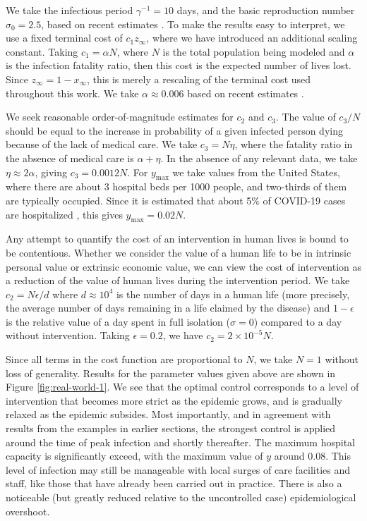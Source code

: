 \documentclass[english,12pt,letter]{article}
\newcommand{\Rnot}{\sigma_0}
\newcommand{\Sinf}{x_\infty}
\newcommand{\ymax}{y_\text{max}}
\begin{document}
We take the infectious period $\gamma^{-1}=10$ days, and the basic reproduction
number $\Rnot=2.5$, based on recent estimates \cite{verity2020estimates,liu2020reproductive}.
To make the results easy to interpret, we use a
fixed terminal cost of $c_1 z_\infty$, where we have introduced an additional
scaling constant.  Taking $c_1 = \alpha N$, where $N$ is the total population
being modeled and $\alpha$ is the infection fatality ratio, then this cost is
the expected number of lives lost.  Since $z_\infty=1-\Sinf$, this is merely a
rescaling of the terminal cost used throughout this work.  We take
$\alpha \approx 0.006$ based on recent estimates \cite{verity2020estimates,russell2020estimating,wu2020estimating}.

We seek reasonable order-of-magnitude estimates for $c_2$ and $c_3$.  
The value of $c_3/N$ should be equal to the increase in probability of a given
infected person dying because of the lack of medical care.  We take
$c_3 = N\eta$,
where the fatality ratio in the absence of medical care is $\alpha+\eta$.
In the absence of any relevant data, we take $\eta\approx 2\alpha$, giving
$c_3 = 0.0012N$.  For $\ymax$ we take values from the United States, where
there are about 3 hospital beds per 1000 people, and two-thirds of them
are typically occupied.  Since it is estimated that about 5\% of COVID-19
cases are hospitalized \cite{verity2020estimates}, this gives $\ymax=0.02N$.

Any attempt to quantify the cost of an intervention in human lives is bound
to be contentious.  Whether we consider the value of a human life to be in
intrinsic personal value or extrinsic economic value, we can view the cost
of intervention as a reduction of the value of human lives during the intervention
period.  We take $c_2 = N\epsilon/d$ where $d\approx 10^4$ is the number
of days in a human life (more precisely, the average number of days remaining
in a life claimed by the disease) and $1-\epsilon$ is the relative value of a
day spent in full isolation ($\sigma=0$) compared to a day without intervention.
Taking $\epsilon=0.2$, we have $c_2 = 2\times10^{-5} N$.

Since all terms in the cost function are proportional to $N$, we take $N=1$ without
loss of generality.  Results for the parameter values given above are shown in Figure
\ref{fig:real-world-1}.  We see that the optimal control corresponds to a level
of intervention that becomes more strict as the epidemic grows, and is gradually
relaxed as the epidemic subsides.  Most importantly, and in agreement with results
from the examples in earlier sections, the strongest control is applied around
the time of peak infection and shortly thereafter.
The maximum hospital capacity is significantly exceed, with the maximum value of $y$
around $0.08$.  This level of infection may still be manageable with local surges
of care facilities and staff, like those that have already been carried out in practice.
There is also a noticeable (but greatly reduced relative to the uncontrolled case)
epidemiological overshoot.
\end{document}
